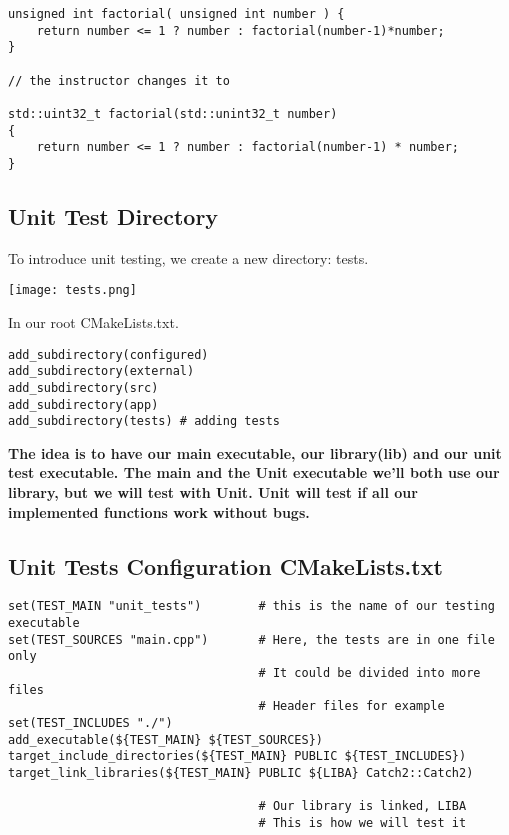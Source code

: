 \documentclass[openany]{report}
\begin{document}
\begin{verbatim}
unsigned int factorial( unsigned int number ) {
    return number <= 1 ? number : factorial(number-1)*number;
}

// the instructor changes it to

std::uint32_t factorial(std::unint32_t number)
{
    return number <= 1 ? number : factorial(number-1) * number;
}
\end{verbatim}

\subsection{Unit Test Directory}

To introduce unit testing, we create a new directory: tests.

\begin{center}
    \texttt{[image: tests.png]}
\end{center}

In our root CMakeLists.txt.  

\begin{verbatim}
add_subdirectory(configured)
add_subdirectory(external)
add_subdirectory(src)
add_subdirectory(app)
add_subdirectory(tests) # adding tests
\end{verbatim}

\textbf{The idea is to have our main executable, our library(lib) and our unit test executable. The main and the Unit
executable we'll both use our library, but we will test with Unit. Unit will test if all our implemented functions work without bugs.}


\subsection{Unit Tests Configuration CMakeLists.txt}

\begin{verbatim}
set(TEST_MAIN "unit_tests")        # this is the name of our testing executable
set(TEST_SOURCES "main.cpp")       # Here, the tests are in one file only
                                   # It could be divided into more files
                                   # Header files for example
set(TEST_INCLUDES "./")
add_executable(${TEST_MAIN} ${TEST_SOURCES})
target_include_directories(${TEST_MAIN} PUBLIC ${TEST_INCLUDES})
target_link_libraries(${TEST_MAIN} PUBLIC ${LIBA} Catch2::Catch2)

                                   # Our library is linked, LIBA
                                   # This is how we will test it
\end{verbatim}
\end{document}
